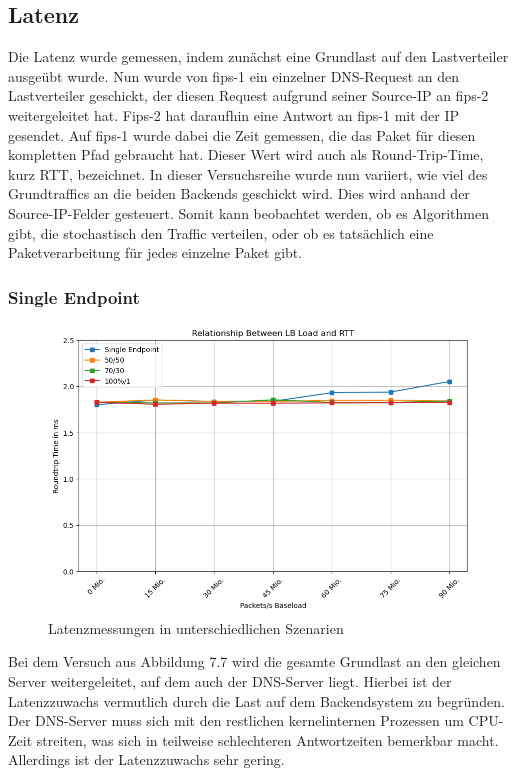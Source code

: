 \subsection{Latenz}
Die Latenz wurde gemessen, indem zunächst eine Grundlast auf den Lastverteiler ausgeübt wurde. Nun wurde von fips-1 ein einzelner DNS-Request an den Lastverteiler geschickt, der diesen Request aufgrund seiner Source-IP an fips-2 weitergeleitet hat. Fips-2 hat daraufhin eine Antwort an fips-1 mit der IP gesendet. Auf fips-1 wurde dabei die Zeit gemessen, die das Paket für diesen kompletten Pfad gebraucht hat. Dieser Wert wird auch als Round-Trip-Time, kurz RTT, bezeichnet. In dieser Versuchsreihe wurde nun variiert, wie viel des Grundtraffics an die beiden Backends geschickt wird. Dies wird anhand der Source-IP-Felder gesteuert. Somit kann beobachtet werden, ob es Algorithmen gibt, die stochastisch den Traffic verteilen, oder ob es tatsächlich eine Paketverarbeitung für jedes einzelne Paket gibt.
\subsubsection{Single Endpoint}
\begin{figure}
    \centering
    \includegraphics[width=0.9\linewidth]{images/latency.png}
    \caption{Latenzmessungen in unterschiedlichen Szenarien}
    \label{fig:enter-label}
\end{figure}
Bei dem Versuch aus Abbildung 7.7 wird die gesamte Grundlast an den gleichen Server weitergeleitet, auf dem auch der DNS-Server liegt. Hierbei ist der Latenzzuwachs vermutlich durch die Last auf dem Backendsystem zu begründen. Der DNS-Server muss sich mit den restlichen kernelinternen Prozessen um CPU-Zeit streiten, was sich in teilweise schlechteren Antwortzeiten bemerkbar macht. Allerdings ist der Latenzzuwachs sehr gering.
